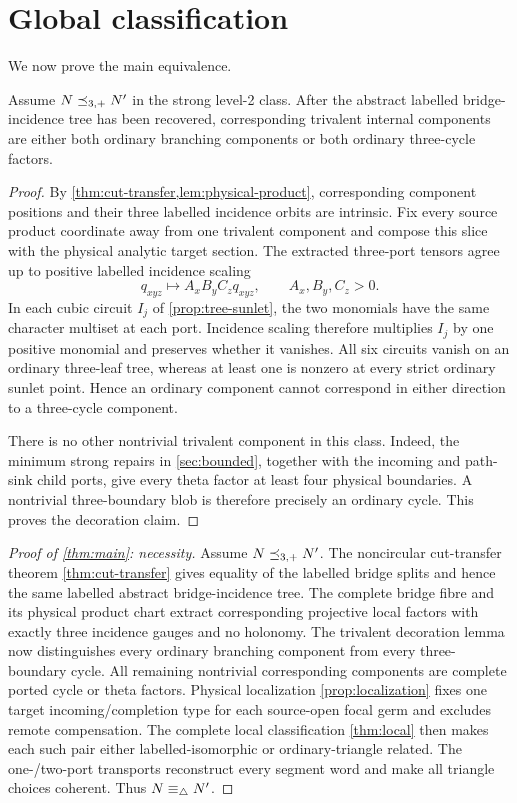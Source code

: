 \section{Global classification}\label{sec:global}

We now prove the main equivalence.

\begin{lemma}\label{lem:trivalent-decoration}
Assume \(N\preceq_{3,+} N'\) in the strong level-2 class.  After the abstract
labelled bridge-incidence tree has been recovered, corresponding trivalent
internal components are either both ordinary branching components or both
ordinary three-cycle factors.
\end{lemma}

\begin{proof}
By \cref{thm:cut-transfer,lem:physical-product}, corresponding component
positions and their three labelled incidence orbits are intrinsic.  Fix every
source product coordinate away from one trivalent component and compose this
slice with the physical analytic target section.  The extracted three-port
tensors agree up to positive labelled incidence scaling
\[
 q_{xyz}\longmapsto A_xB_yC_zq_{xyz},
 \qquad A_x,B_y,C_z>0.
\]
In each cubic circuit \(I_j\) of \cref{prop:tree-sunlet}, the two monomials
have the same character multiset at each port.  Incidence scaling therefore
multiplies \(I_j\) by one positive monomial and preserves whether it vanishes.
All six circuits vanish on an ordinary three-leaf tree, whereas at least one
is nonzero at every strict ordinary sunlet point.  Hence an ordinary component
cannot correspond in either direction to a three-cycle component.

There is no other nontrivial trivalent component in this class.  Indeed, the
minimum strong repairs in \cref{sec:bounded}, together with the incoming and
path-sink child ports, give every theta factor at least four physical
boundaries.  A nontrivial three-boundary blob is therefore precisely an
ordinary cycle.  This proves the decoration claim.
\end{proof}

\begin{proof}[Proof of \cref{thm:main}: necessity]
Assume \(N\preceq_{3,+} N'\).  The noncircular cut-transfer theorem
\cref{thm:cut-transfer} gives equality of the labelled bridge splits and hence
the same labelled abstract bridge-incidence tree.  The complete bridge fibre
and its physical product chart extract corresponding projective local factors
with exactly three incidence gauges and no holonomy.  The trivalent decoration
lemma now distinguishes every ordinary branching component from every
three-boundary cycle.  All remaining nontrivial corresponding components are
complete ported cycle or theta factors.  Physical localization
\cref{prop:localization} fixes one target incoming/completion type for each
source-open focal germ and excludes remote compensation.  The complete local
classification \cref{thm:local} then makes each such pair either
labelled-isomorphic or ordinary-triangle related.  The one-/two-port
transports reconstruct every segment word and make all triangle choices
coherent.  Thus \(N\equiv_\triangle N'\).
\end{proof}

